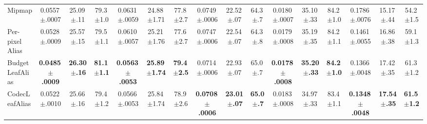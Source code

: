\begin{table}[t]
{\begin{tabular}{l ccc ccc ccc ccc ccc}
Mipmap & 0.0557\,{\scriptsize$\pm$.0007} & 25.09\,{\scriptsize$\pm$.11} & 79.3\,{\scriptsize$\pm$1.0} & 0.0631\,{\scriptsize$\pm$.0059} & 24.88\,{\scriptsize$\pm$1.71} & 77.8\,{\scriptsize$\pm$2.7} & 0.0749\,{\scriptsize$\pm$.0006} & 22.52\,{\scriptsize$\pm$.07} & 64.3\,{\scriptsize$\pm$.7} & 0.0180\,{\scriptsize$\pm$.0007} & 35.10\,{\scriptsize$\pm$.33} & 84.2\,{\scriptsize$\pm$1.0} & 0.1786\,{\scriptsize$\pm$.0076} & 15.17\,{\scriptsize$\pm$.44} & 54.2\,{\scriptsize$\pm$1.5} \\
Per-pixel Alias & 0.0528\,{\scriptsize$\pm$.0009} & 25.57\,{\scriptsize$\pm$.15} & 79.5\,{\scriptsize$\pm$1.1} & 0.0610\,{\scriptsize$\pm$.0057} & 25.21\,{\scriptsize$\pm$1.76} & 77.6\,{\scriptsize$\pm$2.7} & 0.0747\,{\scriptsize$\pm$.0006} & 22.54\,{\scriptsize$\pm$.07} & 64.3\,{\scriptsize$\pm$.8} & 0.0179\,{\scriptsize$\pm$.0008} & 35.19\,{\scriptsize$\pm$.35} & 84.2\,{\scriptsize$\pm$1.1} & 0.1461\,{\scriptsize$\pm$.0055} & 16.86\,{\scriptsize$\pm$.38} & 59.1\,{\scriptsize$\pm$1.3} \\
BudgetLeafAlias & \textbf{0.0485\,{\scriptsize$\pm$.0009}} & \textbf{26.30\,{\scriptsize$\pm$.16}} & \textbf{81.1\,{\scriptsize$\pm$1.1}} & \textbf{0.0563\,{\scriptsize$\pm$.0053}} & \textbf{25.89\,{\scriptsize$\pm$1.74}} & \textbf{79.4\,{\scriptsize$\pm$2.5}} & 0.0714\,{\scriptsize$\pm$.0006} & 22.93\,{\scriptsize$\pm$.07} & 65.0\,{\scriptsize$\pm$.7} & {\textbf{0.0178\,{\scriptsize$\pm$.0008}}} & {\textbf{35.20\,{\scriptsize$\pm$.33}}} & {\textbf{84.2\,{\scriptsize$\pm$1.0}}} & 0.1366\,{\scriptsize$\pm$.0048} & 17.42\,{\scriptsize$\pm$.35} & 61.3\,{\scriptsize$\pm$1.2} \\
CodecLeafAlias & 0.0522\,{\scriptsize$\pm$.0010} & 25.66\,{\scriptsize$\pm$.16} & 79.4\,{\scriptsize$\pm$1.2} & 0.0566\,{\scriptsize$\pm$.0053} & 25.84\,{\scriptsize$\pm$1.74} & 78.9\,{\scriptsize$\pm$2.6} & \textbf{0.0708\,{\scriptsize$\pm$.0006}} & \textbf{23.01\,{\scriptsize$\pm$.07}} & \textbf{65.0\,{\scriptsize$\pm$.7}} & 0.0183\,{\scriptsize$\pm$.0008} & 34.97\,{\scriptsize$\pm$.33} & 83.4\,{\scriptsize$\pm$1.1} & \textbf{0.1348\,{\scriptsize$\pm$.0048}} & \textbf{17.54\,{\scriptsize$\pm$.35}} & \textbf{61.5\,{\scriptsize$\pm$1.2}} \\
\bottomrule
\end{tabular}}
\end{table}
